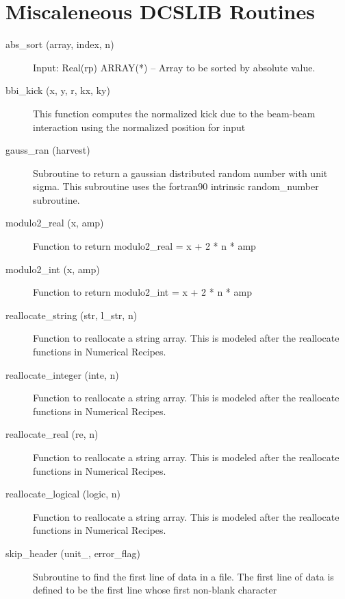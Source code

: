 \section{Miscaleneous DCSLIB Routines}
\label{r:dcs_misc}      

\begin{description}

\item[abs\_sort (array, index, n)] \Newline 
     Input:
         Real(rp)  ARRAY(*)    -- Array to be sorted by absolute value.

\item[bbi\_kick (x, y, r, kx, ky)] \Newline 
     This function computes the normalized kick due to the beam-beam
     interaction using the normalized position for input

\item[gauss\_ran (harvest)] \Newline 
     Subroutine to return a gaussian distributed random number with unit sigma.
     This subroutine uses the fortran90 intrinsic random\_number subroutine.

\item[modulo2\_real (x, amp)] \Newline 
     Function to return
         modulo2\_real = x + 2 * n * amp

\item[modulo2\_int (x, amp)] \Newline 
     Function to return
         modulo2\_int = x + 2 * n * amp

\item[reallocate\_string (str, l\_str, n)] \Newline 
     Function to reallocate a string array.
     This is modeled after the reallocate functions in Numerical Recipes.

\item[reallocate\_integer (inte, n)] \Newline 
     Function to reallocate a string array.
     This is modeled after the reallocate functions in Numerical Recipes.

\item[reallocate\_real (re, n)] \Newline 
     Function to reallocate a string array.
     This is modeled after the reallocate functions in Numerical Recipes.

\item[reallocate\_logical (logic, n)] \Newline 
     Function to reallocate a string array.
     This is modeled after the reallocate functions in Numerical Recipes.


\item[skip\_header (unit\_, error\_flag)] \Newline 
     Subroutine to find the first line of data in a file. The first line of
     data is defined to be the first line whose first non-blank character


\end{description}
